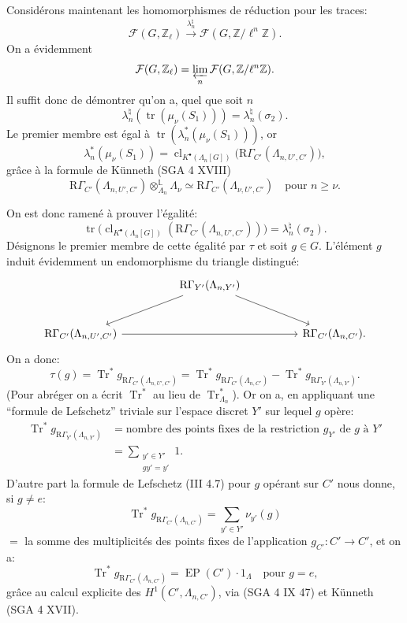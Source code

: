 \documentclass[11pt]{article}
\newcommand{\R}{\mathrm{R}}\newcommand{\RHomCore}{\mathrm{RHom}}
\providecommand{\Tr}{\operatorname{Tr}}
\providecommand{\EP}{\operatorname{EP}}
\providecommand{\Tr}{\operatorname{Tr}}
\providecommand{\Tr}{\operatorname{Tr}}
\providecommand{\R}{\mathrm R}
\providecommand{\Tr}{\operatorname{Tr}}
\providecommand{\EP}{\operatorname{EP}}
\providecommand{\clKstar}[1]{\operatorname{cl}_{K^{\bullet}(#1)}}
\providecommand{\RG}{\R\Gamma}
\providecommand{\Tr}{\operatorname{Tr}}
\begin{document}
Considérons maintenant les homomorphismes de réduction pour les traces:
\[
\mathcal F(G,\mathbb Z_\ell)\xrightarrow{\lambda_n^\natural}\mathcal F(G,\mathbb Z/\ell^n\mathbb Z).
\]
On a évidemment
\[
\mathcal F(G,\mathbb Z_\ell)=\varprojlim_n\mathcal F(G,\mathbb Z/\ell^n\mathbb Z).
\]
Il suffit donc de démontrer qu'on a, quel que soit $n$
\[
\lambda_n^\natural(\operatorname{tr}(\mu_\nu(S_1)))=\lambda_n^\natural(\sigma_2).
\]
Le premier membre est égal à $\operatorname{tr}(\lambda_n^*(\mu_\nu(S_1)))$, or
\[
\lambda_n^*(\mu_\nu(S_1))
=
\clKstar{\Lambda_n[G]}\bigl(\mathrm{R}\Gamma_{C'}(\Lambda_{n,U',C'})\bigr),
\]
grâce à la formule de Künneth (SGA 4 XVIII)
\[
\mathrm{R}\Gamma_{C'}(\Lambda_{n,U',C'})\otimes_{\Lambda_n}^{\mathbb{L}}\Lambda_\nu
\simeq \mathrm{R}\Gamma_{C'}(\Lambda_{\nu,U',C'})
\quad\text{pour } n\ge\nu.
\]

On est donc ramené à prouver l'égalité:
\[
\operatorname{tr}\bigl(\clKstar{\Lambda_n[G]}(\RG_{C'}(\Lambda_{n,U',C'}))\bigr)
=
\lambda_n^\natural(\sigma_2).
\]
Désignons le premier membre de cette égalité par $\tau$ et soit $g\in G$. L'élément $g$ induit évidemment un endomorphisme du triangle distingué:
\[
\begin{tikzcd}[column sep=huge,row sep=large]
& \mathrm{R}\Gamma_{Y'}(\Lambda_{n,Y'}) \arrow[dl] \arrow[dr] & \\
\mathrm{R}\Gamma_{C'}(\Lambda_{n,U',C'}) \arrow[rr] && \mathrm{R}\Gamma_{C'}(\Lambda_{n,C'}).
\end{tikzcd}
\]
On a donc:
\[
\tau(g)=\Tr^*g_{\mathrm{R}\Gamma_{C'}(\Lambda_{n,U',C'})}
=\Tr^*g_{\mathrm{R}\Gamma_{C'}(\Lambda_{n,C'})}
-\Tr^*g_{\mathrm{R}\Gamma_{Y'}(\Lambda_{n,Y'})}.
\]
(Pour abréger on a écrit $\Tr^*$ au lieu de $\Tr^*_{\Lambda_n}$). Or on a, en appliquant une ``formule de Lefschetz'' triviale sur l'espace discret $Y'$ sur lequel $g$ opère:
\[
\begin{aligned}
\Tr^*g_{\mathrm{R}\Gamma_{Y'}(\Lambda_{n,Y'})}
&=\text{nombre des points fixes de la restriction } g_{Y'} \text{ de } g \text{ à } Y'\\
&=\sum_{\substack{y'\in Y'\\gy'=y'}}1.
\end{aligned}
\]
D'autre part la formule de Lefschetz (III 4.7) pour $g$ opérant sur $C'$ nous donne, si $g\ne e$:
\[
\Tr^*g_{\mathrm{R}\Gamma_{C'}(\Lambda_{n,C'})}
=
\sum_{y'\in Y'} \nu_{y'}(g)
\]
$=$ la somme des multiplicités des points fixes de l'application $g_{C'}:C'\to C'$, et on a:
\[
\Tr^*g_{\RG_{C'}(\Lambda_{n,C'})}=\EP(C')\cdot1_\Lambda
\quad\text{pour }g=e,
\]
grâce au calcul explicite des $H^1(C',\Lambda_{n,C'})$, via (SGA 4 IX 47) et
Künneth (SGA 4 XVII).
\end{document}
